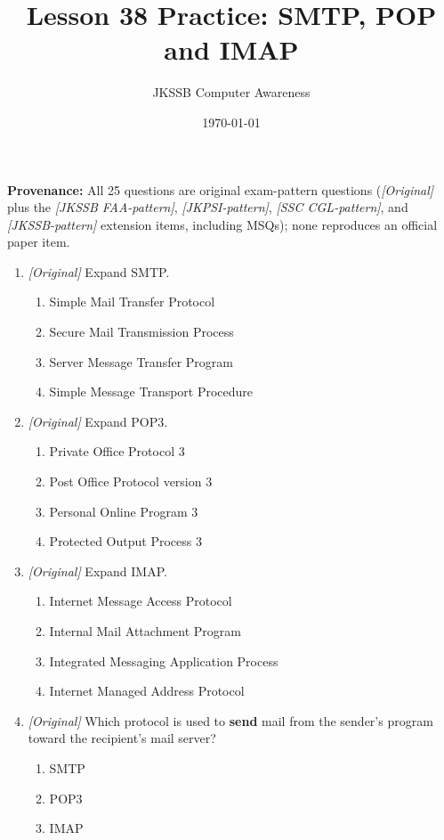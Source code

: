 \documentclass[11pt]{article}
\title{Lesson 38 Practice: SMTP, POP and IMAP}
\author{JKSSB Computer Awareness}
\date{\today}
\begin{document}
\maketitle
\noindent\textbf{Provenance:} All 25 questions are original exam-pattern questions (\textit{[Original]} plus the \textit{[JKSSB FAA-pattern]}, \textit{[JKPSI-pattern]}, \textit{[SSC CGL-pattern]}, and \textit{[JKSSB-pattern]} extension items, including MSQs); none reproduces an official paper item.
\begin{enumerate}[label=\textbf{Q\arabic*.}, leftmargin=*]
\item \textit{[Original]} Expand SMTP.
  \begin{enumerate}[label=\Alph*.]
    \item Simple Mail Transfer Protocol
    \item Secure Mail Transmission Process
    \item Server Message Transfer Program
    \item Simple Message Transport Procedure
  \end{enumerate}
\item \textit{[Original]} Expand POP3.
  \begin{enumerate}[label=\Alph*.]
    \item Private Office Protocol 3
    \item Post Office Protocol version 3
    \item Personal Online Program 3
    \item Protected Output Process 3
  \end{enumerate}
\item \textit{[Original]} Expand IMAP.
  \begin{enumerate}[label=\Alph*.]
    \item Internet Message Access Protocol
    \item Internal Mail Attachment Program
    \item Integrated Messaging Application Process
    \item Internet Managed Address Protocol
  \end{enumerate}
\item \textit{[Original]} Which protocol is used to \textbf{send} mail from
  the sender's program toward the recipient's mail server?
  \begin{enumerate}[label=\Alph*.]
    \item SMTP
    \item POP3
    \item IMAP

\end{enumerate}
\end{enumerate}
\end{document}
